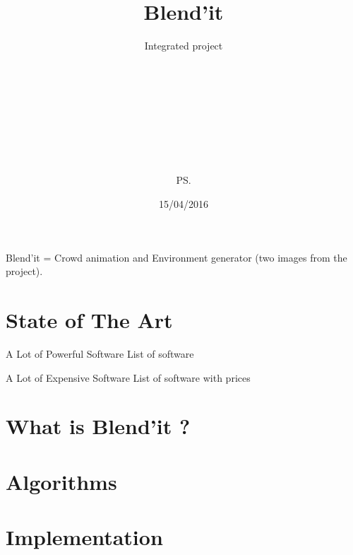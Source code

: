 \documentclass{beamer}
\title{Blend'it}
\subtitle{Integrated project}
\author{\bb\\ \gc\\ \dl\\ \vl\\ \om\\ \mr\\ \me\\ \js\\ \ps\\}
\date{15/04/2016}
\begin{document}
\maketitle

\bgroup
{}
\begin{frame}[plain]{}
\end{frame}
\egroup

\begin{frame}{}
  Blend'it = Crowd animation and Environment generator (two images from the project).
\end{frame}

\section{State of The Art}
\begin{frame}{A Lot of Powerful Software}
  List of software
\end{frame}

\begin{frame}{A Lot of Expensive Software}
  List of software with prices
\end{frame}

\section{What is Blend'it ?}
\section{Algorithms}
\section{Implementation}


\bgroup
{}
\begin{frame}[plain]{}
\end{frame}
\egroup
\end{document}
